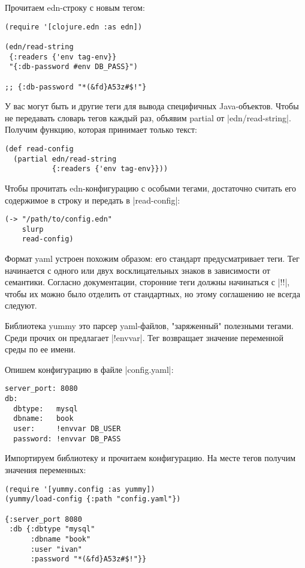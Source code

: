 Прочитаем edn-строку с новым тегом:

\begin{verbatim}
(require '[clojure.edn :as edn])

(edn/read-string
 {:readers {'env tag-env}}
 "{:db-password #env DB_PASS}")

;; {:db-password "*(&fd}A53z#$!"}
\end{verbatim}

У вас могут быть и другие теги для вывода специфичных Java-объектов. Чтобы не
передавать словарь тегов каждый раз, объявим partial от
\spverb|edn/read-string|. Получим функцию, которая принимает только текст:

\begin{verbatim}
(def read-config
  (partial edn/read-string
           {:readers {'env tag-env}}))
\end{verbatim}

Чтобы прочитать edn-конфигурацию с особыми тегами, достаточно считать его
содержимое в строку и передать в \spverb|read-config|:

\begin{verbatim}
(-> "/path/to/config.edn"
    slurp
    read-config)
\end{verbatim}

Формат yaml устроен похожим образом: его стандарт предусматривает теги. Тег
начинается с одного или двух восклицательных знаков в зависимости от
семантики. Согласно документации, сторонние теги должны начинаться с \spverb|!!|, чтобы
их можно было отделить от стандартных, но этому соглашению не всегда следуют.

Библиотека yummy это парсер yaml-файлов, "заряженный" полезными тегами. Среди
прочих он предлагает \spverb|!envvar|. Тег возвращает значение переменной среды по ее
имени.

Опишем конфигурацию в файле \spverb|config.yaml|:

\begin{verbatim}
server_port: 8080
db:
  dbtype:   mysql
  dbname:   book
  user:     !envvar DB_USER
  password: !envvar DB_PASS
\end{verbatim}

Импортируем библиотеку и прочитаем конфигурацию. На месте тегов получим значения
переменных:

\begin{verbatim}
(require '[yummy.config :as yummy])
(yummy/load-config {:path "config.yaml"})

{:server_port 8080
 :db {:dbtype "mysql"
      :dbname "book"
      :user "ivan"
      :password "*(&fd}A53z#$!"}}
\end{verbatim}

